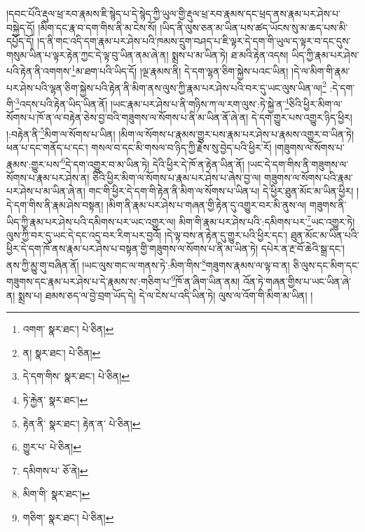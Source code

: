 །དབང་པོའི་རྡུལ་ཕྲ་རབ་རྣམས་ཇི་སྙེད་པ་དེ་སྙེད་ཀྱི་ཡུལ་གྱི་རྡུལ་ཕྲ་རབ་རྣམས་དང་ཕྲད་ནས་རྣམ་པར་ཤེས་པ་བསྐྱེད་དོ། །མིག་དང་རྣ་བ་དག་གིས་ནི་མ་ངེས་སོ། །ཡིད་ནི་ལུས་ཅན་མ་ཡིན་པས་ཚད་ཡོངས་སུ་མ་ཆད་པས་མི་དཔྱོད་དོ། །ད་ནི་གང་འདི་དག་རྣམ་པར་ཤེས་པའི་ཁམས་དྲུག་བཤད་པ་ཇི་ལྟར་དེ་དག་གི་ཡུལ་ད་ལྟར་བ་དང་དུས་གསུམ་ཡིན་པ་ལྟར་རྟེན་ཀྱང་དེ་ལྟ་བུ་ཡིན་ནམ་ཞེ་ན། སྨྲས་པ་མ་ཡིན་ཏེ། ཐ་མའི་རྟེན་འདས། ཡིད་ཀྱི་རྣམ་པར་ཤེས་པའི་རྟེན་ནི་འགགས་\footnote{འགག་  སྣར་ཐང་།  པེ་ཅིན། }མ་ཐག་པའི་ཡིད་དོ། །ལྔ་རྣམས་ནི། དེ་དག་ལྷན་ཅིག་སྐྱེས་པའང་ཡིན། །དེ་ལ་མིག་གི་རྣམ་པར་ཤེས་པའི་ལྷན་ཅིག་སྐྱེས་པའི་རྟེན་ནི་མིག་ནས་ལུས་ཀྱི་རྣམ་པར་ཤེས་པའི་བར་དུ་ཡང་ལུས་ཡིན་ལ།\footnote{ན།  སྣར་ཐང་།  པེ་ཅིན། } :དེ་དག་གི་\footnote{དེ་དག་གིས་  སྣར་ཐང་།  པེ་ཅིན། }འདས་པའི་རྟེན་ཡིད་ཡིན་ནོ། །ཡང་རྣམ་པར་ཤེས་པ་ནི་གཉིས་ཀ་ལ་རག་ལུས་:ཏེ་སྐྱེ་ན་\footnote{ཏེ་རྐྱེན་  སྣར་ཐང་། }ཅིའི་ཕྱིར་མིག་ལ་སོགས་པ་ཁོ་ན་ལ་བརྟེན་ཅེས་བྱ་བའི་གཟུགས་ལ་སོགས་པ་ནི་མ་ཡིན་ནོ་ཞེ་ན། དེ་དག་གྱུར་པས་འགྱུར་ཉིད་ཕྱིར། །:བརྟེན་ནི་\footnote{རྟེན་ནི་  སྣར་ཐང་། རྟེན་ན་  པེ་ཅིན། }མིག་ལ་སོགས་པ་ཡིན། །མིག་ལ་སོགས་པ་རྣམས་གྱུར་པས་རྣམ་པར་ཤེས་པ་རྣམས་འགྱུར་བ་ཡིན་ཏེ། ཕན་པ་དང་གནོད་པ་དང་། གསལ་བ་དང་མི་གསལ་བ་ཉིད་ཀྱི་རྗེས་སུ་བྱེད་པའི་ཕྱིར་རོ། །གཟུགས་ལ་སོགས་པ་རྣམས་:གྱུར་པས་\footnote{གྱུར་པ་  པེ་ཅིན། }དེ་དག་འགྱུར་བ་མ་ཡིན་ཏེ། དེའི་ཕྱིར་དེ་ཁོ་ན་རྟེན་ཡིན་ནོ། །ཡང་དེ་དག་གིས་ནི་གཟུགས་ལ་སོགས་པ་རྣམ་པར་ཤེས་ན། ཅིའི་ཕྱིར་མིག་ལ་སོགས་པ་རྣམ་པར་ཤེས་པ་ཞེས་བྱ་ལ། གཟུགས་ལ་སོགས་པའི་རྣམ་པར་ཤེས་པ་མ་ཡིན་ཞེ་ན། གང་གི་ཕྱིར་དེ་དག་གི་རྟེན་ནི་མིག་ལ་སོགས་པ་ཡིན་པ། དེ་ཕྱིར་ཐུན་མོང་མ་ཡིན་ཕྱིར། །དེ་དག་གིས་ནི་རྣམ་ཤེས་བསྟན། །མིག་ནི་རྣམ་པར་ཤེས་པ་གཞན་གྱི་རྟེན་དུ་འགྱུར་བར་མི་ནུས་ལ། གཟུགས་ནི་ཡིད་ཀྱི་རྣམ་པར་ཤེས་པའི་དམིགས་པར་ཡང་འགྱུར་ལ། མིག་གི་རྣམ་པར་ཤེས་པའི་:དམིགས་པར་\footnote{དམིགས་པ་  ཅོ་ནེ། }ཡང་འགྱུར་ཏེ། ལུས་ཀྱི་བར་དུ་ཡང་དེ་དང་འདྲ་བར་རིག་པར་བྱའོ། །དེ་ལྟ་བས་ན་རྟེན་དུ་གྱུར་པའི་ཕྱིར་དང་། ཐུན་མོང་མ་ཡིན་པའི་ཕྱིར་དེ་དག་ཁོ་ནས་རྣམ་པར་ཤེས་པ་བསྟན་གྱི་གཟུགས་ལ་སོགས་པ་ནི་མ་ཡིན་ཏེ། དཔེར་ན་རྔ་བོ་ཆེའི་སྒྲ་དང་། ནས་ཀྱི་མྱུ་གུ་བཞིན་ནོ། །ཡང་ལུས་གང་ལ་གནས་ཏེ་:མིག་གིས་\footnote{མིག་གི་  སྣར་ཐང་། }གཟུགས་རྣམས་ལ་ལྟ་བ་ན། ཅི་ལུས་དང་མིག་དང་གཟུགས་དང་རྣམ་པར་ཤེས་པ་དེ་རྣམས་ས་:གཅིག་པ་\footnote{གཅིག་  སྣར་ཐང་།  པེ་ཅིན། }ཁོ་ན་ཞིག་ཡིན་ནམ། འོན་ཏེ་གཞན་གྱིས་པ་ཡང་ཡིན་ཞེ་ན། སྨྲས་པ། ཐམས་ཅད་ལ་བྱེ་བྲག་ཡོད་དེ། དེ་ལ་ངེས་པ་འདི་ཡིན་ཏེ། ལུས་ལ་འོག་གི་མིག་མ་ཡིན། །
